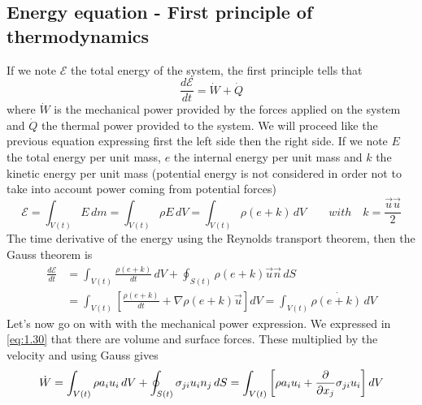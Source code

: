 	\subsection{Energy equation - First principle of thermodynamics}
		If we note $\mathcal{E}$ the total energy of the system, the first principle tells that
		\begin{equation}
			\frac{d\mathcal{E}}{dt} = \dot{W} + \dot{Q}
			\label{eq:1.38}
		\end{equation}
		where $\dot{W}$ is the mechanical power provided by the forces applied on the system and $\dot{Q}$ the thermal power provided to the system. We will proceed like the previous equation expressing first the left side then the right side. If we note $E$ the total energy per unit mass, $e$ the internal energy per unit mass and $k$ the kinetic energy per unit mass (potential energy is not considered in order not to take into account power coming from potential forces)
		\begin{equation}
			\mathcal{E} = \int _{V(t)} E\, dm = \int _{V(t)} \rho E \, dV = \int _{V(t)} \rho (e+k) \, dV \qquad with \quad k = \frac{\vec{u} \vec{u}}{2}
		\end{equation}
		The time derivative of the energy using the Reynolds transport theorem, then the Gauss theorem is 
		\begin{equation}
		\begin{aligned}
			\frac{d\mathcal{E}}{dt} &= \int _{V(t)} \frac{\rho (e+k)}{dt} \, dV + \oint _{S(t)} \rho (e+k)\vec{u} \vec{n} \, dS \\
			&= \int _{V(t)} \left[\frac{\rho (e+k)}{dt} + \nabla \rho (e+k)\vec{u}  \right] dV = \int _{V(t)} \rho \dot{(e+k)}\, dV 
		\end{aligned}
		\label{eq:1.40}
		\end{equation}
		Let's now go on with with the mechanical power expression. We expressed in \autoref{eq:1.30} that there are volume and surface forces. These multiplied by the velocity and using Gauss gives 
		\begin{equation}
			\dot{W} = \int _{V(t)} \rho a_i u_i \, dV + \oint _{S(t)} \sigma _{ji} u_i n_j \, dS = \int _{V(t)} \left[ \rho a_i u_i + \frac{\D}{\D x_j}\sigma _{ji} u_i\right] dV
			\label{eq:1.41}
		\end{equation}
